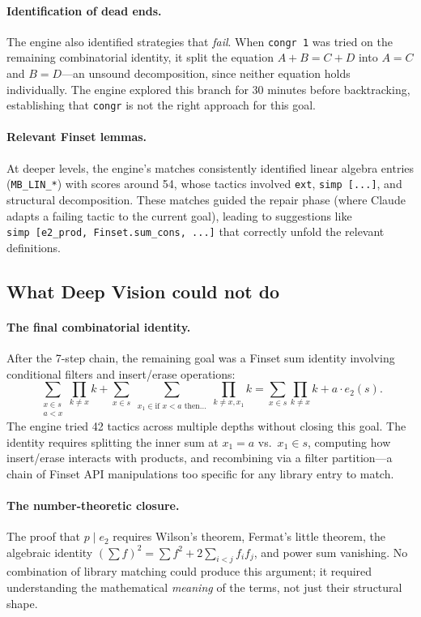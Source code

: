 \documentclass[11pt]{article}
\theoremstyle{definition}
\theoremstyle{remark}
\begin{document}
\paragraph{Identification of dead ends.}
The engine also identified strategies that \emph{fail}. When \texttt{congr~1} was tried on the remaining combinatorial identity, it split the equation $A + B = C + D$ into $A = C$ and $B = D$---an unsound decomposition, since neither equation holds individually. The engine explored this branch for 30 minutes before backtracking, establishing that \texttt{congr} is not the right approach for this goal.

\paragraph{Relevant Finset lemmas.}
At deeper levels, the engine's matches consistently identified linear algebra entries (\texttt{MB\_LIN\_*}) with scores around 54, whose tactics involved \texttt{ext}, \texttt{simp~[...]}, and structural decomposition. These matches guided the repair phase (where Claude adapts a failing tactic to the current goal), leading to suggestions like \texttt{simp~[e2\_prod, Finset.sum\_cons, ...]} that correctly unfold the relevant definitions.

\subsection{What Deep Vision could not do}

\paragraph{The final combinatorial identity.}
After the 7-step chain, the remaining goal was a Finset sum identity involving conditional filters and insert/erase operations:
\[
\sum_{\substack{x \in s \\ a < x}} \prod_{k \neq x} k + \sum_{x \in s} \sum_{\substack{x_1 \in \text{if } x < a \text{ then} \ldots}} \prod_{k \neq x, x_1} k = \sum_{x \in s} \prod_{k \neq x} k + a \cdot e_2(s).
\]
The engine tried 42 tactics across multiple depths without closing this goal. The identity requires splitting the inner sum at $x_1 = a$ vs.\ $x_1 \in s$, computing how insert/erase interacts with products, and recombining via a filter partition---a chain of Finset API manipulations too specific for any library entry to match.

\paragraph{The number-theoretic closure.}
The proof that $p \mid e_2$ requires Wilson's theorem, Fermat's little theorem, the algebraic identity $({\sum f})^2 = \sum f^2 + 2\sum_{i<j} f_i f_j$, and power sum vanishing. No combination of library matching could produce this argument; it required understanding the mathematical \emph{meaning} of the terms, not just their structural shape.
\end{document}
